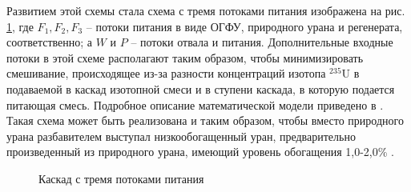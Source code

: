 Развитием этой схемы стала схема с тремя потоками питания изображена на рис. \ref{fig:3_inputs}, где $F_{1}, F_{2}, F_{3}$ -- потоки питания в виде ОГФУ, природного урана и регенерата, соответственно; а $W$ и $P$ -- потоки отвала и питания. Дополнительные входные потоки в этой схеме располагают таким образом, чтобы минимизировать смешивание, происходящее из-за разности концентраций изотопа $^{235}$U в подаваемой в каскад изотопной смеси и в ступени каскада, в которую подается питающая смесь. Подробное описание математической модели приведено в \cite{smirnovEnrichmentRegeneratedUranium2014}. Такая схема может быть реализована и таким образом, чтобы вместо природного урана разбавителем выступал низкообогащенный уран, предварительно произведенный из природного урана, имеющий уровень обогащения 1,0-2,0\% \cite{smirnovDilutionRecycledUranium2015}. 

\begin{figure}[ht]
  \caption{Каскад с тремя потоками питания}\label{fig:3_inputs}
\end{figure}


